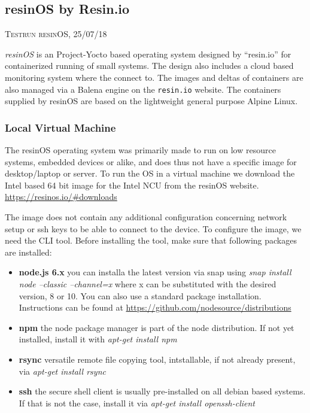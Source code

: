 \documentclass[]{scrartcl}
\begin{document}
\subsection{resinOS by Resin.io}

{\small\textsc{Testrun resinOS, 25/07/18} \bigskip}

\textit{resinOS} is an Project-Yocto based operating system designed by ``resin.io'' for containerized running of small systems. The design also includes a cloud based monitoring system where the connect to. The images and deltas of containers are also managed via a Balena engine on the \texttt{resin.io} website. The containers supplied by resinOS are based on the lightweight general purpose Alpine Linux.

\subsubsection{Local Virtual Machine}

The resinOS operating system was primarily made to run on low resource systems, embedded devices or alike, and does thus not have a specific image for desktop/laptop or server. To run the OS in a virtual machine we download the Intel based 64 bit image for the Intel NCU from the resinOS website. \url{https://resinos.io/#downloads}

The image does not contain any additional configuration concerning network setup or ssh keys to be able to connect to the device. To configure the image, we need the CLI tool. Before installing the tool, make sure that following packages are installed:

\begin{itemize}
	
	\item \textbf{node.js 6.x} you can installa the latest version via snap using \textit{snap install node --classic --channel=x} where x can be substituted with the desired version, 8 or 10. You can also use a standard package installation. Instructions can be found at \url{https://github.com/nodesource/distributions}
	\item \textbf{npm} the node package manager is part of the node distribution. If not yet installed, install it with \textit{apt-get install npm}
	\item \textbf{rsync} versatile remote file copying tool, intstallable, if not already present, via \textit{apt-get install rsync}
	\item \textbf{ssh} the secure shell client is usually pre-installed on all debian based systems. If that is not the case, install it via \textit{apt-get install openssh-client}
	
\end{itemize}
\end{document}
